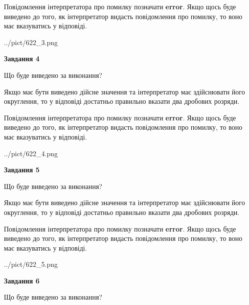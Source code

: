 \documentclass[12pt, ukrainian]{article}
\begin{document}
{\begin {Large}
Повідомлення інтерпретатора про помилку позначати \textbf{error}.
Якщо щось буде виведено до того, як інтерпретатор видасть повідомлення про помилку, 
то воно має вказуватись у відповіді. \par

\begin{center}
	{../pict/622_3.png}
\end{center}
\newpage

{\begin {center}\textbf{Завдання 4}\end {center}}\par
Що буде виведено за виконання? \par

Якщо має бути виведено дійсне значення та інтерпретатор має здійснювати його округлення, 
то у відповіді достатньо правильно вказати два дробових розряди.

Повідомлення інтерпретатора про помилку позначати \textbf{error}.
Якщо щось буде виведено до того, як інтерпретатор видасть повідомлення про помилку, 
то воно має вказуватись у відповіді. \par

\begin{center}
	{../pict/622_4.png}
\end{center}
\newpage

{\begin {center}\textbf{Завдання 5}\end {center}}\par
Що буде виведено за виконання? \par

Якщо має бути виведено дійсне значення та інтерпретатор має здійснювати його округлення, 
то у відповіді достатньо правильно вказати два дробових розряди.

Повідомлення інтерпретатора про помилку позначати \textbf{error}.
Якщо щось буде виведено до того, як інтерпретатор видасть повідомлення про помилку, 
то воно має вказуватись у відповіді. \par

\begin{center}
	{../pict/622_5.png}
\end{center}
\newpage

{\begin {center}\textbf{Завдання 6}\end {center}}\par
Що буде виведено за виконання? \par


\end{Large}}
\end{document}
